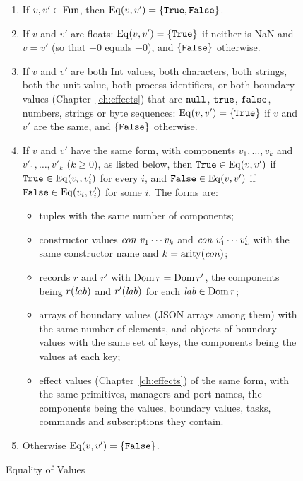 \begin{figure}[htbp]
\centering
\small
\begin{enumerate}
\item If $v,v'\in\mathrm{Fun}$, then $\mathrm{Eq}(v,v')=\{\textnormal{\texttt{True}},\textnormal{\texttt{False}}\}$.
\item If $v$ and $v'$ are floats: $\mathrm{Eq}(v,v')=\{\textnormal{\texttt{True}}\}$ if neither is
  NaN and $v=v'$ (so that $+0$ equals $-0$), and $\{\textnormal{\texttt{False}}\}$ otherwise.
\item If $v$ and $v'$ are both Int values, both characters, both strings,
  both the unit value, both process identifiers, or both boundary values
  (Chapter~\ref{ch:effects}) that are $\mathtt{null}$, $\mathtt{true}$, $\mathtt{false}$,
  numbers, strings or byte sequences:
  $\mathrm{Eq}(v,v')=\{\textnormal{\texttt{True}}\}$ if $v$ and $v'$ are the same, and
  $\{\textnormal{\texttt{False}}\}$ otherwise.
\item If $v$ and $v'$ have the same form, with components $v_1,\ldots,v_k$ and
  $v'_1,\ldots,v'_k$ ($k\geq 0$), as listed below, then
  $\textnormal{\texttt{True}}\in\mathrm{Eq}(v,v')$ if $\textnormal{\texttt{True}}\in\mathrm{Eq}(v_i,v'_i)$ for every $i$, and
  $\textnormal{\texttt{False}}\in\mathrm{Eq}(v,v')$ if $\textnormal{\texttt{False}}\in\mathrm{Eq}(v_i,v'_i)$ for some $i$.
  The forms are:
  \begin{itemize}
  \item tuples with the same number of components;
  \item constructor values $\mathit{con}\ v_1\cdots v_k$ and $\mathit{con}\ v'_1\cdots v'_k$
    with the same constructor name and $k=\mathrm{arity}(\mathit{con})$;
  \item records $r$ and $r'$ with $\mathrm{Dom}\, r=\mathrm{Dom}\, r'$, the components being
    $r(\mathit{lab})$ and $r'(\mathit{lab})$ for each $\mathit{lab}\in\mathrm{Dom}\, r$;
  \item arrays of boundary values (JSON arrays among them) with the same
    number of elements, and objects of boundary values with the same set of
    keys, the components being the values at each key; %
  \item effect values (Chapter~\ref{ch:effects}) of the same form, with the
    same primitives, managers and port names, the components being the values,
    boundary values, tasks, commands and subscriptions they contain.
  \end{itemize}
\item Otherwise $\mathrm{Eq}(v,v')=\{\textnormal{\texttt{False}}\}$.
\end{enumerate}
\caption{Equality of Values}\label{fig:dynamic-basis-eq}
\end{figure}

